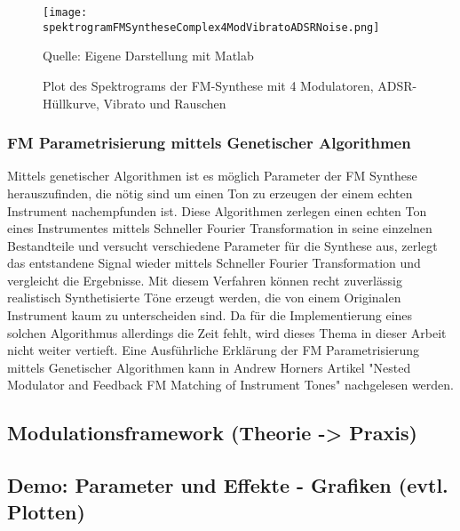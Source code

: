 \begin{figure} [ht]
\centering
  \texttt{[image: spektrogramFMSyntheseComplex4ModVibratoADSRNoise.png]}
\caption{Plot des Spektrograms der FM-Synthese mit 4 Modulatoren, ADSR-Hüllkurve, Vibrato und Rauschen}
\label{fig:spektrogramFMSyntheseComplex4ModVibratoADSRNoise}
Quelle: Eigene Darstellung mit Matlab
\end{figure}



\FloatBarrier
\subsubsection{FM Parametrisierung mittels Genetischer Algorithmen}

Mittels genetischer Algorithmen ist es möglich Parameter der FM Synthese herauszufinden, die nötig sind um einen Ton zu erzeugen der einem echten Instrument nachempfunden ist. Diese Algorithmen zerlegen einen echten Ton eines Instrumentes mittels Schneller Fourier Transformation in seine einzelnen Bestandteile und versucht verschiedene Parameter für die Synthese aus, zerlegt das entstandene Signal wieder mittels Schneller Fourier Transformation und vergleicht die Ergebnisse. Mit diesem Verfahren können recht zuverlässig realistisch Synthetisierte Töne erzeugt werden, die von einem Originalen Instrument kaum zu unterscheiden sind. Da für die Implementierung eines solchen Algorithmus allerdings die Zeit fehlt, wird dieses Thema in dieser Arbeit nicht weiter vertieft. Eine Ausführliche Erklärung der FM Parametrisierung mittels Genetischer Algorithmen kann in Andrew Horners Artikel "Nested Modulator and Feedback FM Matching of Instrument Tones" nachgelesen werden.

\FloatBarrier
\subsection{Modulationsframework (Theorie -> Praxis)}
\FloatBarrier
\subsection{Demo: Parameter und Effekte - Grafiken (evtl. Plotten)}